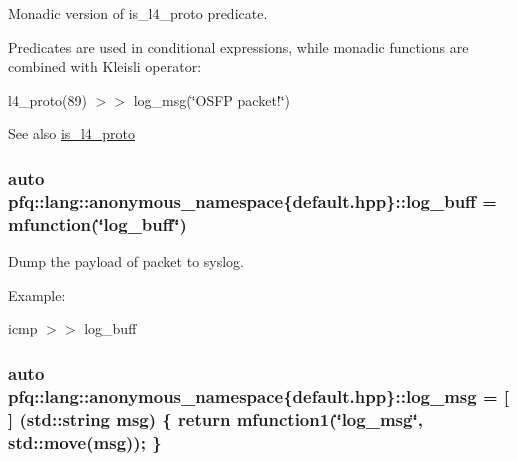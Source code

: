 Monadic version of {\ttfamily is\+\_\+l4\+\_\+proto} predicate. 

Predicates are used in conditional expressions, while monadic functions are combined with Kleisli operator\+:

l4\+\_\+proto(89) $>$$>$ log\+\_\+msg(\char`\"{}\+O\+S\+F\+P packet!\char`\"{})

\begin{DoxySeeAlso}{See also}
\hyperlink{namespacepfq_1_1lang_1_1anonymous__namespace_02default_8hpp_03_a9d06d4dedca1ebdc3b270cb2f3e9e42b}{is\+\_\+l4\+\_\+proto} 
\end{DoxySeeAlso}
\hypertarget{namespacepfq_1_1lang_1_1anonymous__namespace_02default_8hpp_03_ac16d4c4b496e6e882901d84ded462101}{
\subsubsection[{log\+\_\+buff}]{\setlength{\rightskip}{0pt plus 5cm}auto pfq\+::lang\+::anonymous\+\_\+namespace\{default.\+hpp\}\+::log\+\_\+buff = {\bf mfunction}(\char`\"{}log\+\_\+buff\char`\"{})}}\label{namespacepfq_1_1lang_1_1anonymous__namespace_02default_8hpp_03_ac16d4c4b496e6e882901d84ded462101}


Dump the payload of packet to syslog. 

Example\+:

icmp $>$$>$ log\+\_\+buff \hypertarget{namespacepfq_1_1lang_1_1anonymous__namespace_02default_8hpp_03_a82e76226844f043aac9a2dd01615c9bb}{
\subsubsection[{log\+\_\+msg}]{\setlength{\rightskip}{0pt plus 5cm}auto pfq\+::lang\+::anonymous\+\_\+namespace\{default.\+hpp\}\+::log\+\_\+msg = \mbox{[}$\,$\mbox{]} (std\+::string msg) \{ return {\bf mfunction1}(\char`\"{}log\+\_\+msg\char`\"{}, std\+::move(msg)); \}}}\label{namespacepfq_1_1lang_1_1anonymous__namespace_02default_8hpp_03_a82e76226844f043aac9a2dd01615c9bb}


